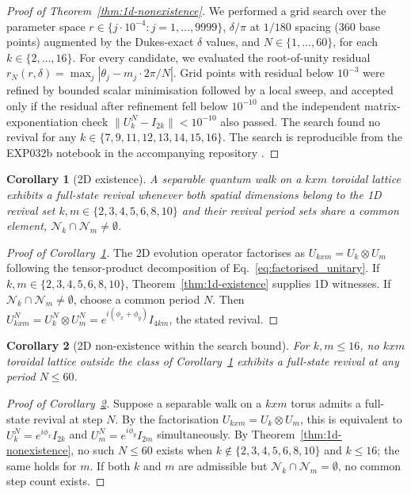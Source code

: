 \documentclass[aps,pra,reprint,amsmath,amssymb,superscriptaddress,floatfix]{revtex4-2}
\newcommand{\Nmax}{60}
\newcommand{\Kmax}{16}
\def\times{x}%
\def\rho{r}%
\newtheorem{corollary}{Corollary}[theorem]
\begin{document}
\begin{proof}[Proof of Theorem~\ref{thm:1d-nonexistence}]
We performed a grid search over the parameter space
$\rho \in \{j \cdot 10^{-4} : j = 1, \ldots, 9999\}$,
$\delta/\pi$ at $1/180$ spacing (360 base points) augmented by
the Dukes-exact $\delta$ values, and $N \in \{1,
\ldots, \Nmax\}$, for each $k \in \{2, \ldots, \Kmax\}$.
For every candidate, we evaluated the root-of-unity residual
$r_N(\rho, \delta) = \max_j |\theta_j - m_j \cdot 2\pi/N|$.
Grid points with residual below $10^{-3}$ were refined by
bounded scalar minimisation followed by a local sweep, and
accepted only if the residual after refinement fell below
$10^{-10}$ and the independent matrix-exponentiation check
$\|U_k^N - I_{2k}\| < 10^{-10}$ also passed. The search
found no revival for any $k \in \{7, 9, 11, 12, 13, 14, 15, 16\}$.
The search is reproducible from the EXP032b notebook in the
accompanying repository \cite{full_revivals_references}.
\end{proof}
\par
\begin{corollary}[2D existence]
\label{cor:2d-existence}
A separable quantum walk on a $k \times m$ toroidal lattice
exhibits a full-state revival whenever both spatial
dimensions belong to the 1D revival set $k, m \in \{2, 3,
4, 5, 6, 8, 10\}$ and their revival period sets share a
common element, $\mathcal{N}_k \cap \mathcal{N}_m \neq
\emptyset$.
\end{corollary}
\par
\begin{proof}[Proof of Corollary~\ref{cor:2d-existence}]
The 2D evolution operator factorises as $U_{k \times m} =
U_k \otimes U_m$ following the tensor-product decomposition
of Eq.~\eqref{eq:factorised_unitary}. If $k, m \in \{2, 3,
4, 5, 6, 8, 10\}$, Theorem~\ref{thm:1d-existence} supplies
1D witnesses. If $\mathcal{N}_k \cap \mathcal{N}_m \neq
\emptyset$, choose a common period $N$. Then
$U_{k \times m}^N = U_k^N \otimes U_m^N = e^{i(\phi_x +
\phi_y)} I_{4km}$, the stated revival.
\end{proof}
\par
\begin{corollary}[2D non-existence within the search bound]
\label{cor:2d-nonexistence}
For $k, m \le \Kmax$, no $k \times m$ toroidal lattice
outside the class of Corollary~\ref{cor:2d-existence}
exhibits a full-state revival at any period $N \le \Nmax$.
\end{corollary}
\par
\begin{proof}[Proof of Corollary~\ref{cor:2d-nonexistence}]
Suppose a separable walk on a $k \times m$ torus admits a
full-state revival at step $N$. By the factorisation
$U_{k \times m} = U_k \otimes U_m$, this is equivalent
to $U_k^N = e^{i\phi_x} I_{2k}$ and $U_m^N = e^{i\phi_y}
I_{2m}$ simultaneously. By Theorem~\ref{thm:1d-nonexistence},
no such $N \le \Nmax$  exists when $k \notin \{2, 3, 4, 5, 6, 8, 10\}$
and $k \le \Kmax$; the same holds for $m$. If both $k$
and $m$ are admissible but $\mathcal{N}_k \cap
\mathcal{N}_m = \emptyset$, no common step count exists.
\end{proof}
\end{document}
